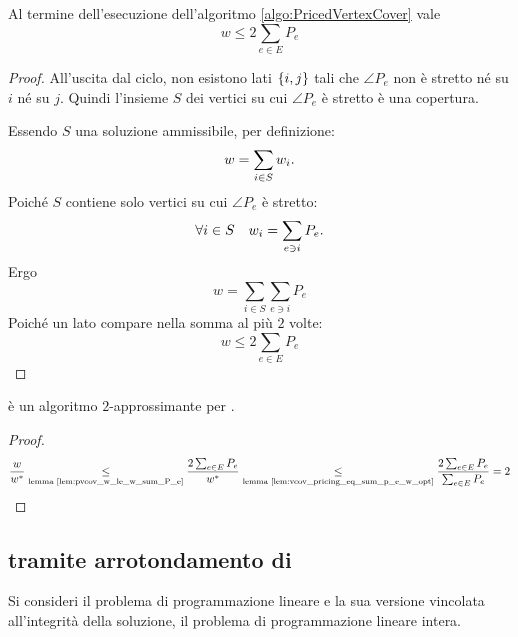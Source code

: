 \begin{lemma}\label{lem:pvcov_w_le_w_sum_P_e}
	Al termine dell'esecuzione dell'algoritmo \ref{algo:PricedVertexCover} vale
	\begin{equation*}
		w \leq 2 \sum_{e \in E} P_e
	\end{equation*}
\end{lemma}
\begin{proof}
	All'uscita dal ciclo, non esistono lati $\set{i,j}$ tali che $\angle{P_e}$ non è stretto né su $i$ né su $j$.
	Quindi l'insieme $S$ dei vertici su cui $\angle{P_e}$ è stretto è una copertura.

	Essendo $S$ una soluzione ammissibile, per definizione:
	\begin{equation*}
		w = \sum_{i\in S} w_i \text.
	\end{equation*}
	Poiché $S$ contiene solo vertici su cui $\angle{P_e}$ è stretto:
	\begin{equation*}
		\forall i\in S \quad w_i = \sum_{e\ni i} P_e \text.
	\end{equation*}
	Ergo
	\begin{equation*}
		w = \sum_{i\in S} \sum_{e\ni i} P_e
	\end{equation*}
	Poiché un lato compare nella somma al più $2$ volte:
	\begin{equation*}
		w \leq 2 \sum_{e\in E} P_e
	\end{equation*}
\end{proof}

\begin{theorem}
	\PricedVertexCover è un algoritmo $2$-approssimante per \VertexCover.
\end{theorem}
\begin{proof}
	\begin{equation*}
		\frac{w}{w\star} \underset{\text{lemma \ref{lem:pvcov_w_le_w_sum_P_e}}}{\leq}
		\frac{2\sum_{e\in E} P_e}{w\star} \underset{\text{lemma \ref{lem:vcov_pricing_eq_sum_p_e_w_opt}}}{\leq}
		\frac{2\sum_{e\in E} P_e}{\sum_{e\in E} P_e} = 2
	\end{equation*}
\end{proof}


\subsection{\VertexCover tramite arrotondamento di \LinearProgramming}
Si consideri il problema di programmazione lineare e la sua versione vincolata all'integrità della soluzione, il problema di programmazione lineare intera.

